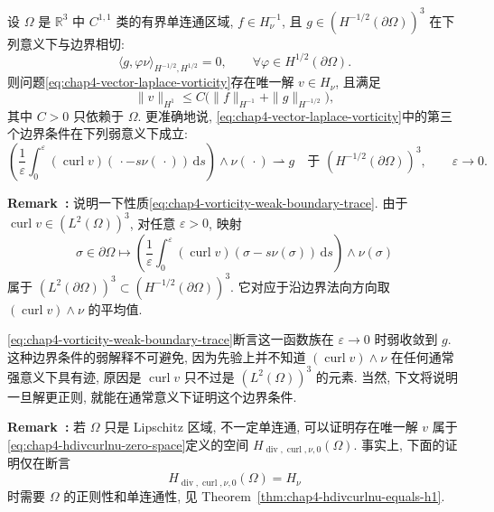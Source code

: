 \begin{Theorem}
\label{thm:chap4-vector-laplace-vorticity-wellposedness}
设 $\Omega$ 是 $\mathbb R^3$ 中 $C^{1,1}$ 类的有界单连通区域, $f\in H_\nu^{-1}$, 且 $g\in(H^{-1/2}(\partial\Omega))^3$ 在下列意义下与边界相切:
\begin{equation}
 \langle g,\varphi\nu\rangle_{H^{-1/2},H^{1/2}}=0,
 \qquad\forall\varphi\in H^{1/2}(\partial\Omega).
 \label{eq:chap4-vorticity-tangential-data}
\end{equation}
则问题\eqref{eq:chap4-vector-laplace-vorticity}存在唯一解 $v\in H_\nu$, 且满足
\[
 \|v\|_{H^1}\leq C\bigl(\|f\|_{H^{-1}}+\|g\|_{H^{-1/2}}\bigr),
\]
其中 $C>0$ 只依赖于 $\Omega$. 更准确地说, \eqref{eq:chap4-vector-laplace-vorticity}中的第三个边界条件在下列弱意义下成立:
\begin{equation}
 \left(\frac1\varepsilon\int_0^\varepsilon
 (\operatorname{curl}v)(\,\cdot-s\nu(\,\cdot))\,\mathrm ds\right)\wedge\nu(\,\cdot)
 \rightharpoonup g
 \quad\text{于 }(H^{-1/2}(\partial\Omega))^3,
 \qquad\varepsilon\to0.
 \label{eq:chap4-vorticity-weak-boundary-trace}
\end{equation}
\end{Theorem}

\par\noindent{}\textbf{Remark~\thechapterfoursectionnineremark:}\label{rem:chap4-vorticity-weak-boundary-trace}\quad
说明一下性质\eqref{eq:chap4-vorticity-weak-boundary-trace}. 由于 $\operatorname{curl}v\in(L^2(\Omega))^3$, 对任意 $\varepsilon>0$, 映射
\[
 \sigma\in\partial\Omega\longmapsto
 \left(\frac1\varepsilon\int_0^\varepsilon
 (\operatorname{curl}v)(\sigma-s\nu(\sigma))\,\mathrm ds\right)\wedge\nu(\sigma)
\]
属于 $(L^2(\partial\Omega))^3\subset(H^{-1/2}(\partial\Omega))^3$. 它对应于沿边界法向方向取 $(\operatorname{curl}v)\wedge\nu$ 的平均值.

\eqref{eq:chap4-vorticity-weak-boundary-trace}断言这一函数族在 $\varepsilon\to0$ 时弱收敛到 $g$. 这种边界条件的弱解释不可避免, 因为先验上并不知道 $(\operatorname{curl}v)\wedge\nu$ 在任何通常强意义下具有迹, 原因是 $\operatorname{curl}v$ 只不过是 $(L^2(\Omega))^3$ 的元素. 当然, 下文将说明一旦解更正则, 就能在通常意义下证明这个边界条件.

\par\noindent{}\textbf{Remark~\thechapterfoursectionnineremark:}\label{rem:chap4-vorticity-lipschitz-nonsimply-connected}\quad
若 $\Omega$ 只是 Lipschitz 区域, 不一定单连通, 可以证明存在唯一解 $v$ 属于\eqref{eq:chap4-hdivcurlnu-zero-space}定义的空间 $H_{\operatorname{div},\operatorname{curl},\nu,0}(\Omega)$. 事实上, 下面的证明仅在断言
\[
 H_{\operatorname{div},\operatorname{curl},\nu,0}(\Omega)=H_\nu
\]
时需要 $\Omega$ 的正则性和单连通性, 见 Theorem~\ref{thm:chap4-hdivcurlnu-equals-h1}.

